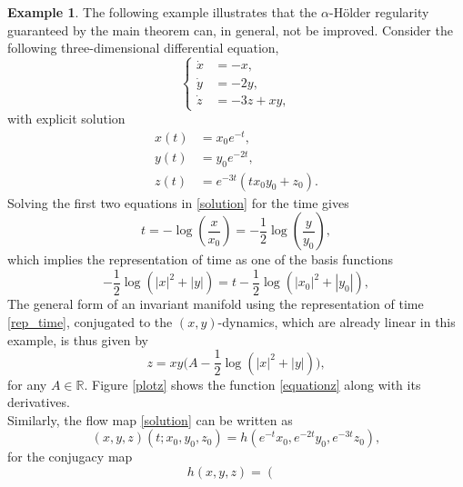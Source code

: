 \documentclass{amsart}
\theoremstyle{plain}
\theoremstyle{definition}
\newtheorem{example}[theorem]{Example}
\begin{document}
\begin{example}
    The following example illustrates that the $\alpha$-H\"{older} regularity guaranteed by the main theorem can, in general, not be improved. Consider the following three-dimensional differential equation,
    \begin{equation}\label{system_example}
        \begin{cases}
            \dot{x} & = - x,\\
            \dot{y} & = -2y,\\
            \dot{z} & = -3z + xy,
         \end{cases}
    \end{equation}
with explicit solution
\begin{equation}\label{solution}
\begin{split}
    x(t) & = x_0 e^{-t},\\
    y(t) & = y_0 e^{-2t},\\
    z(t) & = e^{-3t}(t x_0 y_0 + z_0). 
\end{split}
\end{equation}
Solving the first two equations in \eqref{solution} for the time gives 
\begin{equation}
    t = -\log\left(\frac{x}{x_0}\right) = -\frac{1}{2}\log\left(\frac{y}{y_0}\right),
\end{equation}
which implies the representation of time as one of the basis functions 
\begin{equation}\label{rep_time}
    -\frac{1}{2}\log(|x|^2+|y|)
    =t-\frac{1}{2}\log(|x_0|^2+|y_0|),
\end{equation}
The general form of an invariant manifold using the representation of time \eqref{rep_time}, conjugated to the $(x,y)$-dynamics, which are already linear in this example, is thus given by\begin{equation}
\label{equationz}
z = xy \Big(A -\frac{1}{2} \log(|x|^2+|y|) \Big),
\end{equation}
for any $A\in \mathbb{R}$. Figure \ref{plotz} shows the function \eqref{equationz} along with its derivatives. \\
Similarly, the flow map \eqref{solution} can be written as 
\begin{equation}
    (x,y,z)(t;x_0,y_0,z_0) = h(e^{-t}x_0,e^{-2t}y_0,e^{-3t}z_0),
\end{equation}
for the conjugacy map
\begin{equation}\label{h}
    h(x,y,z) = \left(\begin{array}{c}

\end{array}
\end{equation}
\end{example}
\end{document}
